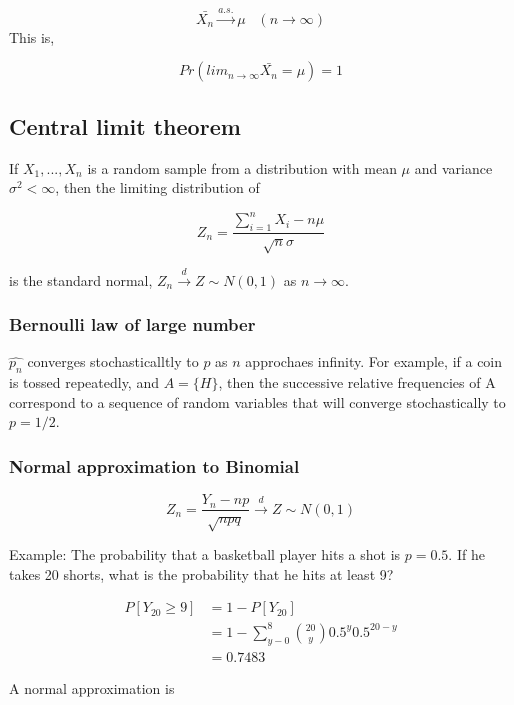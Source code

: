\documentclass[
]{book}
\begin{document}
\[\bar{X_n} \xrightarrow{a.s.} \mu \; \; \; (n \rightarrow \infty)\]
This is,

\[Pr(lim_{n \rightarrow \infty} \bar{X_n}=\mu)=1\]

\hypertarget{central-limit-theorem}{%
\subsection{Central limit theorem}\label{central-limit-theorem}}

If \(X_1,...,X_n\) is a random sample from a distribution with mean \(\mu\) and variance \(\sigma^2 < \infty\), then the limiting distribution of

\[Z_n=\frac{\sum_{i=1}^n X_i - n\mu}{\sqrt{n} \sigma}\]

is the standard normal, \(Z_n \xrightarrow{d} Z \sim N(0,1)\) as \(n \rightarrow \infty\).

\hypertarget{bernoulli-law-of-large-number}{%
\subsubsection{Bernoulli law of large number}\label{bernoulli-law-of-large-number}}

\(\hat{p_n}\) converges stochasticalltly to \(p\) as \(n\) approchaes infinity. For example, if a coin is tossed repeatedly, and \(A=\{H\}\), then the successive relative frequencies of A correspond to a sequence of random variables that will converge stochastically to \(p=1/2\).

\hypertarget{normal-approximation-to-binomial}{%
\subsubsection{Normal approximation to Binomial}\label{normal-approximation-to-binomial}}

\[Z_n=\frac{Y_n-np}{\sqrt{npq}} \xrightarrow{d} Z \sim N(0, 1)\]

Example: The probability that a basketball player hits a shot is \(p=0.5\). If he takes 20 shorts, what is the probability that he hits at least 9?

\[\begin{aligned} P[Y_{20} \geq 9] &=1-P[Y_{20}] \\ &=1- \sum_{y-0}^8 \binom{20}{y} 0.5^y0.5^{20-y} \\&=0.7483 \end{aligned} \]

A normal approximation is
\end{document}
